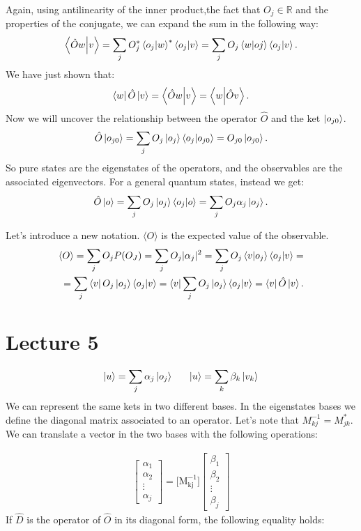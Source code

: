 \documentclass{article}
\begin{document}
Again, using antilinearity of the inner product,the fact that $O_j \in \mathbb{R}$ and the properties of the conjugate, we can expand the sum in the following way:
$$\bra{\hat{O}w}\ket{v} = \sum_j O_j^* \bra{o_j}\ket{w}^* \bra{o_j}\ket{v} = \sum_j O_j \bra{w}\ket{oj} \bra{o_j}\ket{v}.$$
We have just shown that:
$$\bra{w}  \hat{O}\ket{v}   =\bra{\hat{O}w}\ket{v} = \bra{w}  \ket{\hat{O}v}. $$
Now we will uncover the relationship between the operator $\hat{O}$ and the ket $\ket{o_{j0}}$.
$$\hat{O} \ket{o_{j0}} = \sum_j O_j \ket{o_j} \bra{o_j}\ket{o_{j0}} = O_{j0} \ket{o_{j0}}.  $$
So pure states are the eigenstates of the operators, and the observables are the associated eigenvectors.
For a general quantum states, instead we get:
$$\hat{O} \ket{o} = \sum_j O_j \ket{o_j} \bra{o_j}\ket{o} = \sum_j O_j \alpha_j \ket{o_j}.$$

Let's introduce a new notation. $\langle O \rangle$ is the expected value of the observable.
\begin{align*}
 \langle O \rangle  = \sum_j O_j P(O_J) = \sum_j O_j  | \alpha_j |^2 = \sum_j O_j \bra{v}\ket{o_j}\bra{o_j}\ket{v} = \\ = \sum_j  \bra{v} O_j \ket{o_j} \bra{o_j}\ket{v} 
 = \bra{v} \sum_j O_j \ket{o_j}\bra{o_j}\ket{v} = \bra{v} \hat{O} \ket{v}.
 \end{align*}

\section{Lecture 5}

$$ \ket{u} = \sum_j \alpha_j \ket{o_j} \ \ \ \ \ \ket{u} = \sum_k \beta_k \ket{v_k} $$
 We can represent the same kets in two different bases. In the eigenstates bases we define the diagonal matrix associated to an operator. Let's note that $M^{-1}_{kj} = M_{jk}^*$. We can translate a vector in the two bases with the following operations:
 
   \begin{align*}
    \begin{bmatrix}
           \alpha_1 \\
           \alpha_2  \\
           \vdots \\
           \alpha_j
         \end{bmatrix}  =  \Bigr[ \mathrm{M_{kj}^{-1}} \Bigr] \begin{bmatrix}
             \beta_1 \\
             \beta_2 \\
             \vdots \\
             \beta_j
         \end{bmatrix}
  \end{align*}
If $\hat{D}$ is the operator of $\hat{O}$ in its diagonal form, the following equality holds:
  
\end{document}
